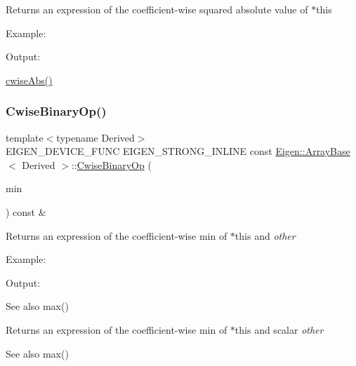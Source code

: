 \begin{DoxyReturn}{Returns}
an expression of the coefficient-\/wise squared absolute value of {\ttfamily $\ast$this} 
\end{DoxyReturn}
Example\+: 
\begin{DoxyCodeInclude}{0}
\end{DoxyCodeInclude}
 Output\+: 
\begin{DoxyVerbInclude}
\end{DoxyVerbInclude}
 \mbox{\hyperlink{class_eigen_1_1_array_base_a43bf848499e8562675e8c5881ac1ee97}{cwise\+Abs()}} \mbox{\label{class_eigen_1_1_array_base_afbdf5d7a9c31675ff41dc4f958d7cae0}} 
\subsubsection{\texorpdfstring{CwiseBinaryOp()}{CwiseBinaryOp()}\hspace{0.1cm}{\footnotesize\ttfamily [1/2]}}
{\footnotesize\ttfamily template$<$typename Derived$>$ \\
E\+I\+G\+E\+N\+\_\+\+D\+E\+V\+I\+C\+E\+\_\+\+F\+U\+NC E\+I\+G\+E\+N\+\_\+\+S\+T\+R\+O\+N\+G\+\_\+\+I\+N\+L\+I\+NE const \mbox{\hyperlink{class_eigen_1_1_array_base}{Eigen\+::\+Array\+Base}}$<$ Derived $>$\+::\mbox{\hyperlink{class_eigen_1_1_cwise_binary_op}{Cwise\+Binary\+Op}} (\begin{DoxyParamCaption}\item[{min}]{ }\end{DoxyParamCaption}) const \&\hspace{0.3cm}{\ttfamily [inline]}}

\begin{DoxyReturn}{Returns}
an expression of the coefficient-\/wise min of {\ttfamily $\ast$this} and {\itshape other} 
\end{DoxyReturn}
Example\+: 
\begin{DoxyCodeInclude}{0}
\end{DoxyCodeInclude}
 Output\+: 
\begin{DoxyVerbInclude}
\end{DoxyVerbInclude}


\begin{DoxySeeAlso}{See also}
max()
\end{DoxySeeAlso}
\begin{DoxyReturn}{Returns}
an expression of the coefficient-\/wise min of {\ttfamily $\ast$this} and scalar {\itshape other} 
\end{DoxyReturn}
\begin{DoxySeeAlso}{See also}
max() 
\end{DoxySeeAlso}
\mbox{\label{class_eigen_1_1_array_base_a68d2610358935e40366d367da8777eee}} 
